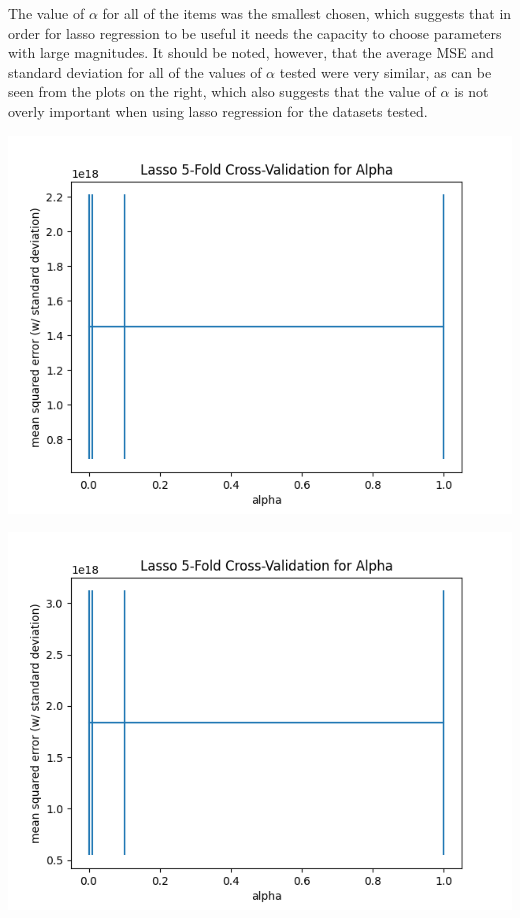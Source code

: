 \documentclass[10pt]{article}
\begin{document}
		\begin{minipage}[t]{0.3\linewidth}
		The value of $\alpha$ for all of the items was the smallest chosen, which suggests that in order for lasso regression to be useful it needs the capacity to choose parameters with large magnitudes. It should be noted, however, that the average MSE and standard deviation for all of the values of $\alpha$ tested were very similar, as can be seen from the plots on the right, which also suggests that the value of $\alpha$ is not overly important when using lasso regression for the datasets tested.
		\end{minipage}\qquad%
		\begin{minipage}[t]{0.8\linewidth}
			\begin{minipage}{0.35\linewidth}
				\includegraphics[width=\linewidth]{../graphs/stasis_webifier_lasso_alpha_crossval.png}
			\end{minipage}\quad%
			\begin{minipage}{0.35\linewidth}
				\includegraphics[width=\linewidth]{../graphs/shield_booster_lasso_alpha_crossval.png}
			\end{minipage}
			

\end{minipage}
\end{document}
